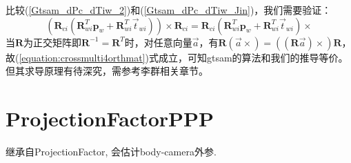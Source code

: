 \documentclass{article}
\begin{document}
比较(\ref{Gtsam_dPc_dTiw_2})和(\ref{Gtsam_dPc_dTiw_Jin})，我们需要验证：
\begin{equation} 
	(\boldsymbol{R}_{ci}(\boldsymbol{R}_{wi}^T\boldsymbol{p}_w+\boldsymbol{R}_{wi}^T\vec{t}_{wi}))\times \boldsymbol{R}_{ci}=
	\boldsymbol{R}_{ci}(\boldsymbol{R}_{wi}^T  \boldsymbol{p}_w+\boldsymbol{R}_{wi}^T\vec{t}_{wi})\times 
	\label{equation:crossmulti4orthmat}
\end{equation} 
当$\boldsymbol{R}$为正交矩阵即$\boldsymbol{R}^{-1}=\boldsymbol{R}^T$时，对任意向量$\vec{a}$，有$\boldsymbol{R}(\vec{a}\times)=((\boldsymbol{R}\vec{a})\times)\boldsymbol{R}$，故(\ref{equation:crossmulti4orthmat})式成立，可知gtsam的算法和我们的推导等价。但其求导原理有待深究，需参考李群相关章节。

\section{ProjectionFactorPPP}
继承自ProjectionFactor, 会估计body-camera外参.
\end{document}
